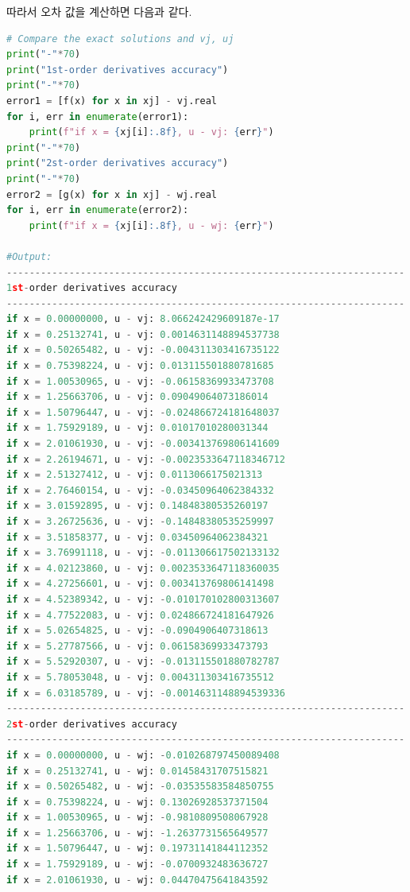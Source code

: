 \documentclass[11pt]{article}
\begin{document}
따라서 오차 값을 계산하면 다음과 같다.

\begin{lstlisting}[language=Python]
# Compare the exact solutions and vj, uj
print("-"*70)
print("1st-order derivatives accuracy")
print("-"*70)
error1 = [f(x) for x in xj] - vj.real
for i, err in enumerate(error1):
    print(f"if x = {xj[i]:.8f}, u - vj: {err}")
print("-"*70)
print("2st-order derivatives accuracy")
print("-"*70)
error2 = [g(x) for x in xj] - wj.real
for i, err in enumerate(error2):
    print(f"if x = {xj[i]:.8f}, u - wj: {err}")
    
#Output:
----------------------------------------------------------------------
1st-order derivatives accuracy
----------------------------------------------------------------------
if x = 0.00000000, u - vj: 8.066242429609187e-17
if x = 0.25132741, u - vj: 0.0014631148894537738
if x = 0.50265482, u - vj: -0.004311303416735122
if x = 0.75398224, u - vj: 0.013115501880781685
if x = 1.00530965, u - vj: -0.06158369933473708
if x = 1.25663706, u - vj: 0.09049064073186014
if x = 1.50796447, u - vj: -0.024866724181648037
if x = 1.75929189, u - vj: 0.01017010280031344
if x = 2.01061930, u - vj: -0.003413769806141609
if x = 2.26194671, u - vj: -0.0023533647118346712
if x = 2.51327412, u - vj: 0.0113066175021313
if x = 2.76460154, u - vj: -0.03450964062384332
if x = 3.01592895, u - vj: 0.14848380535260197
if x = 3.26725636, u - vj: -0.14848380535259997
if x = 3.51858377, u - vj: 0.03450964062384321
if x = 3.76991118, u - vj: -0.011306617502133132
if x = 4.02123860, u - vj: 0.0023533647118360035
if x = 4.27256601, u - vj: 0.003413769806141498
if x = 4.52389342, u - vj: -0.010170102800313607
if x = 4.77522083, u - vj: 0.024866724181647926
if x = 5.02654825, u - vj: -0.0904906407318613
if x = 5.27787566, u - vj: 0.06158369933473793
if x = 5.52920307, u - vj: -0.013115501880782787
if x = 5.78053048, u - vj: 0.004311303416735512
if x = 6.03185789, u - vj: -0.0014631148894539336
----------------------------------------------------------------------
2st-order derivatives accuracy
----------------------------------------------------------------------
if x = 0.00000000, u - wj: -0.010268797450089408
if x = 0.25132741, u - wj: 0.01458431707515821
if x = 0.50265482, u - wj: -0.03535583584850755
if x = 0.75398224, u - wj: 0.13026928537371504
if x = 1.00530965, u - wj: -0.9810809508067928
if x = 1.25663706, u - wj: -1.2637731565649577
if x = 1.50796447, u - wj: 0.19731141844112352
if x = 1.75929189, u - wj: -0.0700932483636727
if x = 2.01061930, u - wj: 0.04470475641843592

\end{lstlisting}
\end{document}
